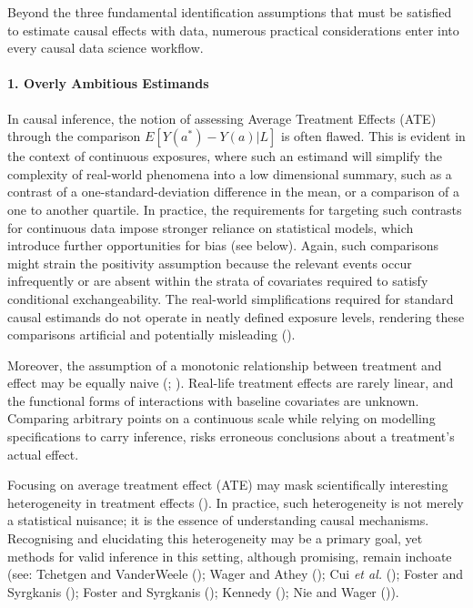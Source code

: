 \documentclass[
  singlecolumn,
  9pt]{article}
\let\oldparagraph\paragraph
\renewcommand{\paragraph}[1]{\oldparagraph{#1}\mbox{}}
\begin{document}
Beyond the three fundamental identification assumptions that must be
satisfied to estimate causal effects with data, numerous practical
considerations enter into every causal data science workflow.

\paragraph{1. Overly Ambitious
Estimands}\label{overly-ambitious-estimands}

In causal inference, the notion of assessing Average Treatment Effects
(ATE) through the comparison \(E[Y(a^*) - Y(a)|L]\) is often flawed.
This is evident in the context of continuous exposures, where such an
estimand will simplify the complexity of real-world phenomena into a low
dimensional summary, such as a contrast of a one-standard-deviation
difference in the mean, or a comparison of a one to another quartile. In
practice, the requirements for targeting such contrasts for continuous
data impose stronger reliance on statistical models, which introduce
further opportunities for bias (see below). Again, such comparisons
might strain the positivity assumption because the relevant events occur
infrequently or are absent within the strata of covariates required to
satisfy conditional exchangeability. The real-world simplifications
required for standard causal estimands do not operate in neatly defined
exposure levels, rendering these comparisons artificial and potentially
misleading ().

Moreover, the assumption of a monotonic relationship between treatment
and effect may be equally naive (; ). Real-life treatment effects are rarely linear, and the
functional forms of interactions with baseline covariates are unknown.
Comparing arbitrary points on a continuous scale while relying on
modelling specifications to carry inference, risks erroneous conclusions
about a treatment's actual effect.

Focusing on average treatment effect (ATE) may mask scientifically
interesting heterogeneity in treatment effects
(). In practice, such
heterogeneity is not merely a statistical nuisance; it is the essence of
understanding causal mechanisms. Recognising and elucidating this
heterogeneity may be a primary goal, yet methods for valid inference in
this setting, although promising, remain inchoate (see: Tchetgen and
VanderWeele (); Wager and Athey
(); Cui \emph{et al.}
(); Foster and Syrgkanis
(); Foster and Syrgkanis
(); Kennedy
(); Nie and Wager
()).
\end{document}

